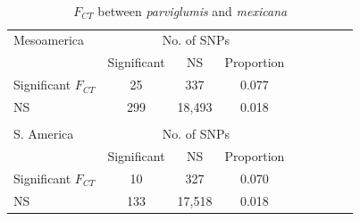 \renewcommand{\arraystretch}{1.1}
\begin{table}[h]

\begin{center}
 \caption[]{$F_{CT}$ between \emph{parviglumis} and \emph{mexicana}\hspace*{0.3cm}}
  \textbf{}\\[-2mm]
{\fontsize{7}{11}\sf
    \begin{tabular}{lcccccccl} 
    \hline\hline
       
Mesoamerica     & \multicolumn{3}{c}{No. of SNPs}  \\
                                  & Significant & NS          & Proportion  \\
Significant $F_{CT}$ & 25              &   337       & 0.077\\ 
NS                             & 299            &  18,493   & 0.018\\
      \hline
    & & \\[-3mm]
S. America     & \multicolumn{3}{c}{No. of SNPs} \\
                                     & Significant & NS           & Proportion  \\
Significant $F_{CT}$    & 10              &   327        & 0.070\\ 
NS                                & 133            &  17,518    & 0.018\\[1mm]
    \hline\hline
    \end{tabular}
    \label{tanja}  %
}
\end{center}
\end{table}
\renewcommand{\arraystretch}{1}



